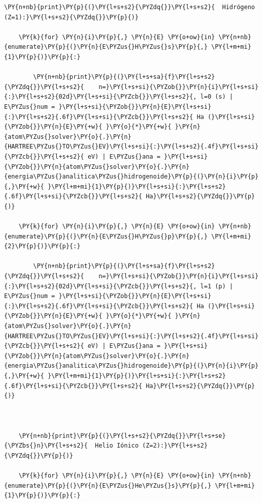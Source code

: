 \documentclass[11pt]{article}
\makeatletter
\def\PY@reset{\let\PY@it=\relax \let\PY@bf=\relax \let\PY@ul=\relax \let\PY@tc=\relax \let\PY@bc=\relax \let\PY@ff=\relax}
\def\PY@tok#1{\csname PY@tok@#1\endcsname}
\def\PY@toks#1+{\ifx\relax#1\empty\else \PY@tok{#1}\expandafter\PY@toks\fi}
\def\PY@do#1{\PY@bc{\PY@tc{\PY@ul{\PY@it{\PY@bf{\PY@ff{#1}}}}}}}
\def\PY#1#2{\PY@reset\PY@toks#1+\relax+\PY@do{#2}}
\def\PYZbs{\char`\\} \def\PYZus{\char`\_} \def\PYZob{\char`\{} \def\PYZcb{\char`\}} \def\PYZca{\char`\^} \def\PYZam{\char`\&} \def\PYZlt{\char`\<} \def\PYZgt{\char`\>} \def\PYZsh{\char`\#} \def\PYZpc{\char`\%} \def\PYZdl{\char`\$} \def\PYZhy{\char`\-} \def\PYZsq{\char`\'} \def\PYZdq{\char`\"} \def\PYZti{\char`\~}
\makeatother
\begin{document}
\begin{tcolorbox}[breakable, size=fbox, boxrule=1pt, pad at break*=1mm,colback=cellbackground, colframe=cellborder]
\begin{Verbatim}[commandchars=\\\{\}]
    \PY{n+nb}{print}\PY{p}{(}\PY{l+s+s2}{\PYZdq{}}\PY{l+s+s2}{  Hidrógeno (Z=1):}\PY{l+s+s2}{\PYZdq{}}\PY{p}{)}

    \PY{k}{for} \PY{n}{i}\PY{p}{,} \PY{n}{E} \PY{o+ow}{in} \PY{n+nb}{enumerate}\PY{p}{(}\PY{n}{E\PYZus{}H\PYZus{}s}\PY{p}{,} \PY{l+m+mi}{1}\PY{p}{)}\PY{p}{:}

        \PY{n+nb}{print}\PY{p}{(}\PY{l+s+sa}{f}\PY{l+s+s2}{\PYZdq{}}\PY{l+s+s2}{    n=}\PY{l+s+si}{\PYZob{}}\PY{n}{i}\PY{l+s+si}{:}\PY{l+s+s2}{02d}\PY{l+s+si}{\PYZcb{}}\PY{l+s+s2}{, l=0 (s) | E\PYZus{}num = }\PY{l+s+si}{\PYZob{}}\PY{n}{E}\PY{l+s+si}{:}\PY{l+s+s2}{.6f}\PY{l+s+si}{\PYZcb{}}\PY{l+s+s2}{ Ha (}\PY{l+s+si}{\PYZob{}}\PY{n}{E}\PY{+w}{ }\PY{o}{*}\PY{+w}{ }\PY{n}{atom\PYZus{}solver}\PY{o}{.}\PY{n}{HARTREE\PYZus{}TO\PYZus{}EV}\PY{l+s+si}{:}\PY{l+s+s2}{.4f}\PY{l+s+si}{\PYZcb{}}\PY{l+s+s2}{ eV) | E\PYZus{}ana = }\PY{l+s+si}{\PYZob{}}\PY{n}{atom\PYZus{}solver}\PY{o}{.}\PY{n}{energia\PYZus{}analitica\PYZus{}hidrogenoide}\PY{p}{(}\PY{n}{i}\PY{p}{,}\PY{+w}{ }\PY{l+m+mi}{1}\PY{p}{)}\PY{l+s+si}{:}\PY{l+s+s2}{.6f}\PY{l+s+si}{\PYZcb{}}\PY{l+s+s2}{ Ha}\PY{l+s+s2}{\PYZdq{}}\PY{p}{)}

    \PY{k}{for} \PY{n}{i}\PY{p}{,} \PY{n}{E} \PY{o+ow}{in} \PY{n+nb}{enumerate}\PY{p}{(}\PY{n}{E\PYZus{}H\PYZus{}p}\PY{p}{,} \PY{l+m+mi}{2}\PY{p}{)}\PY{p}{:}

        \PY{n+nb}{print}\PY{p}{(}\PY{l+s+sa}{f}\PY{l+s+s2}{\PYZdq{}}\PY{l+s+s2}{    n=}\PY{l+s+si}{\PYZob{}}\PY{n}{i}\PY{l+s+si}{:}\PY{l+s+s2}{02d}\PY{l+s+si}{\PYZcb{}}\PY{l+s+s2}{, l=1 (p) | E\PYZus{}num = }\PY{l+s+si}{\PYZob{}}\PY{n}{E}\PY{l+s+si}{:}\PY{l+s+s2}{.6f}\PY{l+s+si}{\PYZcb{}}\PY{l+s+s2}{ Ha (}\PY{l+s+si}{\PYZob{}}\PY{n}{E}\PY{+w}{ }\PY{o}{*}\PY{+w}{ }\PY{n}{atom\PYZus{}solver}\PY{o}{.}\PY{n}{HARTREE\PYZus{}TO\PYZus{}EV}\PY{l+s+si}{:}\PY{l+s+s2}{.4f}\PY{l+s+si}{\PYZcb{}}\PY{l+s+s2}{ eV) | E\PYZus{}ana = }\PY{l+s+si}{\PYZob{}}\PY{n}{atom\PYZus{}solver}\PY{o}{.}\PY{n}{energia\PYZus{}analitica\PYZus{}hidrogenoide}\PY{p}{(}\PY{n}{i}\PY{p}{,}\PY{+w}{ }\PY{l+m+mi}{1}\PY{p}{)}\PY{l+s+si}{:}\PY{l+s+s2}{.6f}\PY{l+s+si}{\PYZcb{}}\PY{l+s+s2}{ Ha}\PY{l+s+s2}{\PYZdq{}}\PY{p}{)}

        

    \PY{n+nb}{print}\PY{p}{(}\PY{l+s+s2}{\PYZdq{}}\PY{l+s+se}{\PYZbs{}n}\PY{l+s+s2}{  Helio Iónico (Z=2):}\PY{l+s+s2}{\PYZdq{}}\PY{p}{)}

    \PY{k}{for} \PY{n}{i}\PY{p}{,} \PY{n}{E} \PY{o+ow}{in} \PY{n+nb}{enumerate}\PY{p}{(}\PY{n}{E\PYZus{}He\PYZus{}s}\PY{p}{,} \PY{l+m+mi}{1}\PY{p}{)}\PY{p}{:}


\end{Verbatim}
\end{tcolorbox}
\end{document}
